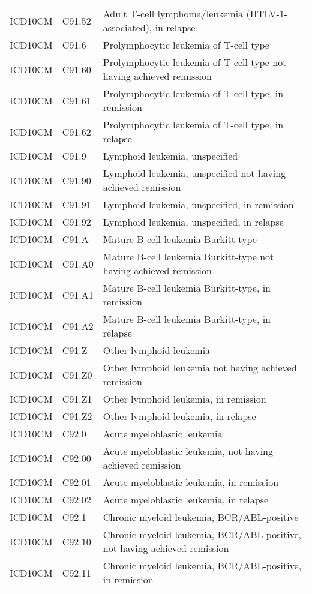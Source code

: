 \begin{longtable}{p{}p{}p{}}
  ICD10CM & C91.52 & Adult T-cell lymphoma/leukemia (HTLV-1-associated), in relapse \\ 
  ICD10CM & C91.6 & Prolymphocytic leukemia of T-cell type \\ 
  ICD10CM & C91.60 & Prolymphocytic leukemia of T-cell type not having achieved remission \\ 
  ICD10CM & C91.61 & Prolymphocytic leukemia of T-cell type, in remission \\ 
  ICD10CM & C91.62 & Prolymphocytic leukemia of T-cell type, in relapse \\ 
  ICD10CM & C91.9 & Lymphoid leukemia, unspecified \\ 
  ICD10CM & C91.90 & Lymphoid leukemia, unspecified not having achieved remission \\ 
  ICD10CM & C91.91 & Lymphoid leukemia, unspecified, in remission \\ 
  ICD10CM & C91.92 & Lymphoid leukemia, unspecified, in relapse \\ 
  ICD10CM & C91.A & Mature B-cell leukemia Burkitt-type \\ 
  ICD10CM & C91.A0 & Mature B-cell leukemia Burkitt-type not having achieved remission \\ 
  ICD10CM & C91.A1 & Mature B-cell leukemia Burkitt-type, in remission \\ 
  ICD10CM & C91.A2 & Mature B-cell leukemia Burkitt-type, in relapse \\ 
  ICD10CM & C91.Z & Other lymphoid leukemia \\ 
  ICD10CM & C91.Z0 & Other lymphoid leukemia not having achieved remission \\ 
  ICD10CM & C91.Z1 & Other lymphoid leukemia, in remission \\ 
  ICD10CM & C91.Z2 & Other lymphoid leukemia, in relapse \\ 
  ICD10CM & C92.0 & Acute myeloblastic leukemia \\ 
  ICD10CM & C92.00 & Acute myeloblastic leukemia, not having achieved remission \\ 
  ICD10CM & C92.01 & Acute myeloblastic leukemia, in remission \\ 
  ICD10CM & C92.02 & Acute myeloblastic leukemia, in relapse \\ 
  ICD10CM & C92.1 & Chronic myeloid leukemia, BCR/ABL-positive \\ 
  ICD10CM & C92.10 & Chronic myeloid leukemia, BCR/ABL-positive, not having achieved remission \\ 
  ICD10CM & C92.11 & Chronic myeloid leukemia, BCR/ABL-positive, in remission \\ 

\end{longtable}
